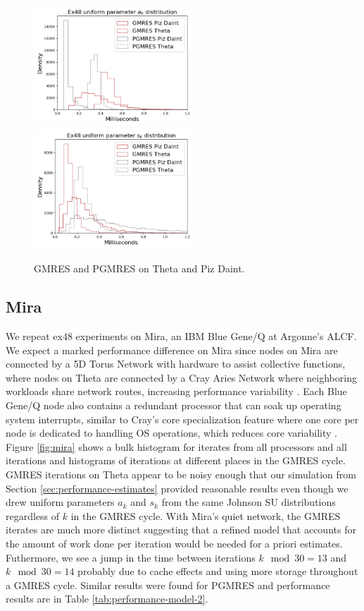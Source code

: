 \documentclass[num-refs]{wiley-article}
\begin{document}
\begin{figure}[b]
\centering
\includegraphics[width=6cm]{../plots/THETA_PIZDAINT_ex48_8192_1000000_uniform_a_k.png} 
\includegraphics[width=6cm]{../plots/THETA_PIZDAINT_ex48_8192_1000000_uniform_s_k.png}
\caption{GMRES and PGMRES on Theta and Piz Daint.} \label{fig:pizdaint}
\end{figure}


\subsection{Mira}\label{sec:mira}

We repeat ex48 experiments on Mira, an IBM Blue Gene/Q \cite{kumaran2016introduction} at Argonne's ALCF.  
We expect a marked performance difference on Mira since 
nodes on Mira are connected by a 5D Torus Network with hardware to assist collective functions, 
where nodes on Theta are connected by a Cray Aries Network where neighboring workloads share network routes, increasing performance variability \cite{groves2017understanding}. 
Each Blue Gene/Q node also contains a redundant processor that can soak up operating system interrupts, similar to Cray's core specialization feature where one core per node is dedicated to handling OS operations, which reduces core variability \cite{chunduri2017run}.
Figure \ref{fig:mira} shows a bulk histogram for iterates from all processors and all iterations and  histograms of iterations at different places in the GMRES cycle. 
GMRES iterations on Theta appear to be noisy enough that our simulation from Section \ref{sec:performance-estimates} provided reasonable results even though we drew uniform parameters $a_k$ and $s_k$ from the same Johnson SU distributions regardless of $k$ in the GMRES cycle. 
With Mira's quiet network, the GMRES iterates are much more distinct suggesting that a refined model that accounts for the amount of work done per iteration would be needed for a priori estimates.
Futhermore, we see a jump in the time between iterations $k \mod 30 = 13$ and $k \mod 30 = 14$ probably due to cache effects and using more storage throughout a GMRES cycle. 
Similar results were found for PGMRES and performance results are in Table \ref{tab:performance-model-2}.
\end{document}
